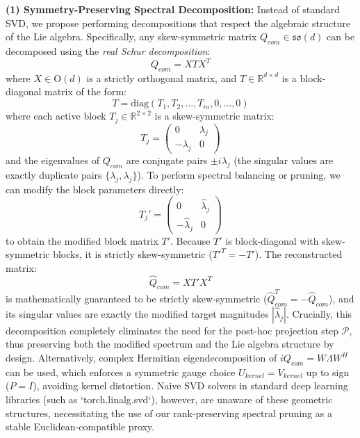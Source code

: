 \textbf{(1) Symmetry-Preserving Spectral Decomposition:} Instead of standard SVD, we propose performing decompositions that respect the algebraic structure of the Lie algebra. Specifically, any skew-symmetric matrix $Q_{com} \in \mathfrak{so}(d)$ can be decomposed using the \emph{real Schur decomposition}:
\begin{equation}
Q_{com} = X T X^T
\end{equation}
where $X \in \mathrm{O}(d)$ is a strictly orthogonal matrix, and $T \in \mathbb{R}^{d \times d}$ is a block-diagonal matrix of the form:
\begin{equation}
T = \mathrm{diag}(T_1, T_2, \dots, T_m, 0, \dots, 0)
\end{equation}
where each active block $T_j \in \mathbb{R}^{2 \times 2}$ is a skew-symmetric matrix:
\begin{equation}
T_j = \begin{pmatrix} 0 & \lambda_j \\ -\lambda_j & 0 \end{pmatrix}
\end{equation}
and the eigenvalues of $Q_{com}$ are conjugate pairs $\pm i \lambda_j$ (the singular values are exactly duplicate pairs $\{\lambda_j, \lambda_j\}$). To perform spectral balancing or pruning, we can modify the block parameters directly:
\begin{equation}
T_j' = \begin{pmatrix} 0 & \hat{\lambda}_j \\ -\hat{\lambda}_j & 0 \end{pmatrix}
\end{equation}
to obtain the modified block matrix $T'$. Because $T'$ is block-diagonal with skew-symmetric blocks, it is strictly skew-symmetric ($T'^T = -T'$). The reconstructed matrix:
\begin{equation}
\hat{Q}_{com} = X T' X^T
\end{equation}
is mathematically guaranteed to be strictly skew-symmetric ($\hat{Q}_{com}^T = -\hat{Q}_{com}$), and its singular values are exactly the modified target magnitudes $|\hat{\lambda}_j|$. Crucially, this decomposition completely eliminates the need for the post-hoc projection step $\mathcal{P}$, thus preserving both the modified spectrum and the Lie algebra structure by design. Alternatively, complex Hermitian eigendecomposition of $i Q_{com} = W \Lambda W^H$ can be used, which enforces a symmetric gauge choice $U_{kernel} = V_{kernel}$ up to sign ($P = I$), avoiding kernel distortion. Naive SVD solvers in standard deep learning libraries (such as `torch.linalg.svd`), however, are unaware of these geometric structures, necessitating the use of our rank-preserving spectral pruning as a stable Euclidean-compatible proxy.

